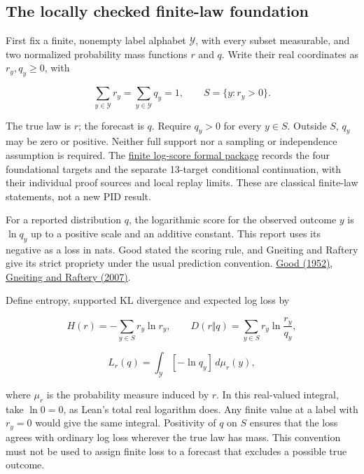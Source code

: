 \documentclass[11pt,a4paper]{article}
\newcounter{none}
\begin{document}
\par{}

\subsection{The locally checked finite-law foundation}\label{the-locally-checked-finite-law-foundation}

First fix a finite, nonempty label alphabet \(\mathcal Y\), with every subset measurable, and two normalized probability mass functions \(r\) and \(q\). Write their real coordinates as \(r_y,q_y\geq0\), with

\[
\sum_{y\in\mathcal Y}r_y=\sum_{y\in\mathcal Y}q_y=1,
\qquad S=\{y:r_y>0\}.
\]

The true law is \(r\); the forecast is \(q\). Require \(q_y>0\) for every \(y\in S\). Outside \(S\), \(q_y\) may be zero or positive. Neither full support nor a sampling or independence assumption is required. The \href{https://github.com/sepahead/pid-rs/blob/main/audit/formal/lean-finite-logscore/PUBLICATION.md}{finite log-score formal package} records the four foundational targets and the separate 13-target conditional continuation, with their individual proof sources and local replay limits. These are classical finite-law statements, not a new PID result.

For a reported distribution \(q\), the logarithmic score for the observed outcome \(y\) is \(\ln q_y\) up to a positive scale and an additive constant. This report uses its negative as a loss in nats. Good stated the scoring rule, and Gneiting and Raftery give its strict propriety under the usual prediction convention. \href{https://doi.org/10.1111/j.2517-6161.1952.tb00104.x}{Good (1952)}, \href{https://doi.org/10.1198/016214506000001437}{Gneiting and Raftery (2007)}.

Define entropy, supported KL divergence and expected log loss by

\[
H(r)=-\sum_{y\in S}r_y\ln r_y,
\qquad D(r\Vert q)=\sum_{y\in S}r_y\ln\frac{r_y}{q_y},
\]

\[
L_r(q)=\int_{\mathcal Y}[-\ln q_y]\,d\mu_r(y),
\]

where \(\mu_r\) is the probability measure induced by \(r\). In this real-valued integral, take \(\ln0=0\), as Lean's total real logarithm does. Any finite value at a label with \(r_y=0\) would give the same integral. Positivity of \(q\) on \(S\) ensures that the loss agrees with ordinary log loss wherever the true law has mass. This convention must not be used to assign finite loss to a forecast that excludes a possible true outcome.
\end{document}
